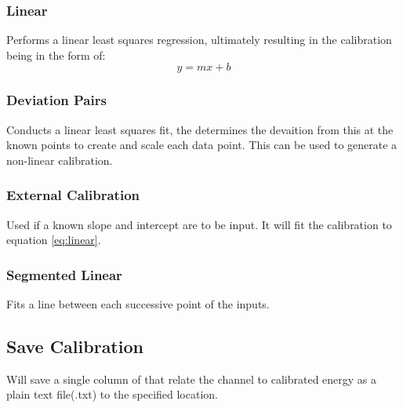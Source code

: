 				\subsubsection{Linear}
				Performs a linear least squares regression, ultimately resulting in the calibration being in the form of:
				\begin{equation}
				 	y=mx+b
				\label{eq:linear}
				\end{equation}
				\subsubsection{Deviation Pairs}
				Conducts a linear least squares fit, the determines the devaition from this at the known points to create and scale each data point. This can be used to generate a non-linear calibration.
				\subsubsection{External Calibration}
				Used if a known slope and intercept are to be input. It will fit the calibration to equation \ref{eq:linear}.
				\subsubsection{Segmented Linear}
				Fits a line between each successive point of the inputs.
	\subsection{Save Calibration}
	Will save a single column of that relate the channel to calibrated energy as a plain text file(.txt) to the specified location.
